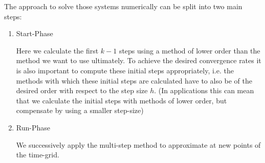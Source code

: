 %

The approach to solve those systems numerically can be split into two main steps:
\begin{enumerate}
	\item Start-Phase
	
	Here we calculate the first $k-1$ steps using a method of lower order than the method we want to use ultimately. To achieve the desired convergence rates it is also important to compute these initial steps appropriately, i.e. the methods with which these initial steps are calculated have to also be of the desired order with respect to the step size $h$. (In applications this can mean that we calculate the initial steps with methods of lower order, but compensate by using a smaller step-size)
		
	\item Run-Phase
	
	We successively apply the multi-step method to approximate at new points of the time-grid.
	
\end{enumerate}

